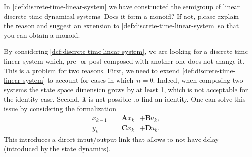 \begin{exercise}
    In \cref{def:discrete-time-linear-system} we have constructed the semigroup of linear discrete-time dynamical systems.
    Does it form a monoid?
    If not, please explain the reason and suggest an extension to \cref{def:discrete-time-linear-system} so that you can obtain a monoid.
\end{exercise}
\begin{solution}
    By considering \cref{def:discrete-time-linear-system}, we are looking for a discrete-time linear system which, pre- or post-composed with another one does not change it.
    This is a problem for two reasons.
    First, we need to extend \cref{def:discrete-time-linear-system} to account for cases in which~$n=0$.
    Indeed, when composing two systems the state space dimension grows by at least 1, which is not acceptable for the identity case.
    Second, it is not possible to find an identity.
    One can solve this issue by considering the formalization
    \begin{equation}
        \label{eq:discrete-time-dynamics-D}
        \begin{aligned}
            x_{k+1} & =  \mathbf{A} x_k & + \mathbf{B} u_k, \\
            y_{k}   & =  \mathbf{C} x_k & + \mathbf{D} u_k.
        \end{aligned}
    \end{equation}
    This introduces a direct input/output link that allows to not have delay (introduced by the state dynamics).
\end{solution}

